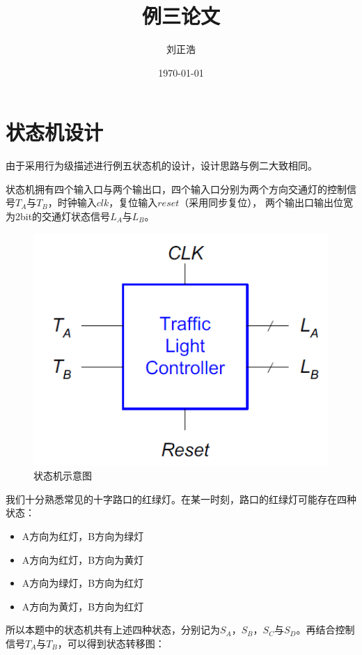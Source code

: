 \documentclass[a4paper]{article}
\title{\heiti\zihao{2} 例三论文}
\author{\songti 刘正浩}
\date{\today}
\begin{document}
	\maketitle
	\thispagestyle{empty}


\tableofcontents
	\section{状态机设计}
		由于采用行为级描述进行例五状态机的设计，设计思路与例二大致相同。\par
		状态机拥有四个输入口与两个输出口，四个输入口分别为两个方向交通灯的控制信号$T_A$与$T_B$，时钟输入$clk$，复位输入$reset$（采用同步复位），
		两个输出口输出位宽为2bit的交通灯状态信号$L_A$与$L_B$。
		\begin{figure}[htbp]
			\centering
			\includegraphics[scale=0.6]{状态机示意图.png}
			\caption{状态机示意图}
		\end{figure}\par
		我们十分熟悉常见的十字路口的红绿灯。在某一时刻，路口的红绿灯可能存在四种状态：
		\begin{itemize}
			\item A方向为红灯，B方向为绿灯
			\item A方向为红灯，B方向为黄灯
			\item A方向为绿灯，B方向为红灯
			\item A方向为黄灯，B方向为红灯
		\end{itemize}
		所以本题中的状态机共有上述四种状态，分别记为$S_A$，$S_B$，$S_C$与$S_D$。再结合控制信号$T_A$与$T_B$，可以得到状态转移图：
\end{document}
